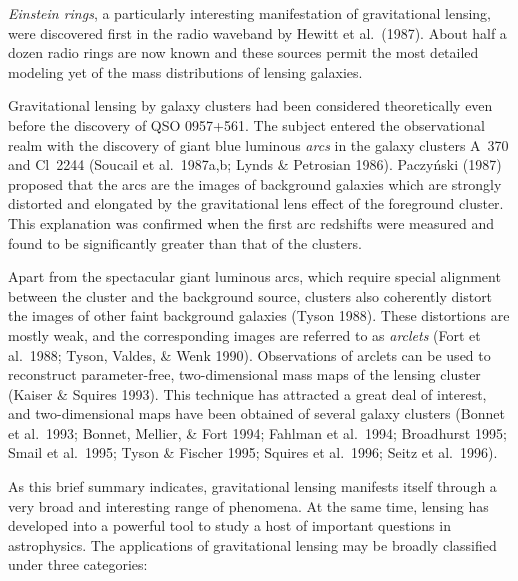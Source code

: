 \documentclass[a4paper,10pt]{article} %
\begin{document}
{\em Einstein rings\/}, a particularly interesting manifestation of
gravitational lensing, were discovered first in the radio waveband by
Hewitt et al.\ (1987). About half a dozen radio rings are now known
and these sources permit the most detailed modeling yet of the mass
distributions of lensing galaxies.

Gravitational lensing by galaxy clusters had been considered
theoretically even before the discovery of QSO 0957+561. The subject
entered the observational realm with the discovery of giant blue
luminous {\em arcs\/} in the galaxy clusters A~370 and Cl~2244
(Soucail et al.\ 1987a,b; Lynds \& Petrosian 1986). Paczy\'nski (1987)
proposed that the arcs are the images of background galaxies which are
strongly distorted and elongated by the gravitational lens effect of
the foreground cluster. This explanation was confirmed when the first
arc redshifts were measured and found to be significantly greater than
that of the clusters.

Apart from the spectacular giant luminous arcs, which require special
alignment between the cluster and the background source, clusters also
coherently distort the images of other faint background galaxies
(Tyson 1988). These distortions are mostly weak, and the corresponding
images are referred to as {\em arclets\/} (Fort et al.\ 1988; Tyson,
Valdes, \& Wenk 1990). Observations of arclets can be used to
reconstruct parameter-free, two-dimensional mass maps of the lensing
cluster (Kaiser \& Squires 1993). This technique has attracted a great
deal of interest, and two-dimensional maps have been obtained of
several galaxy clusters (Bonnet et al.\ 1993; Bonnet, Mellier, \& Fort
1994; Fahlman et al.\ 1994; Broadhurst 1995; Smail et al.\ 1995; Tyson
\& Fischer 1995; Squires et al.\ 1996; Seitz et al.\ 1996).

As this brief summary indicates, gravitational lensing manifests
itself through a very broad and interesting range of phenomena. At the
same time, lensing has developed into a powerful tool to study a host
of important questions in astrophysics. The applications of
gravitational lensing may be broadly classified under three
categories:
\end{document}

